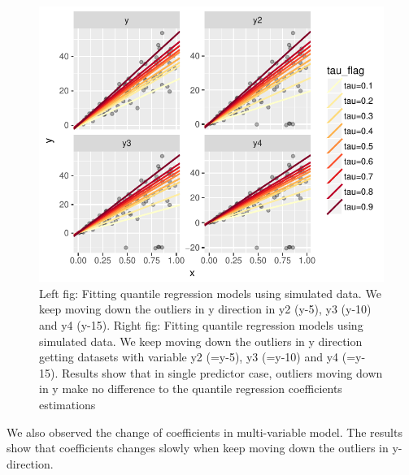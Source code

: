 \documentclass[11pt,a4paper,]{article}
\theoremstyle{definition}
\theoremstyle{definition}
\theoremstyle{remark}
\begin{document}
\begin{figure}

{\centering \includegraphics{Diagnosing_outliers_and_visualization_of_quantile_regression_models_files/figure-latex/move-y1-1} 

}

\caption{Left fig: Fitting quantile regression models using simulated data. We keep moving down the outliers in y direction in y2 (y-5), y3 (y-10) and y4 (y-15). Right fig: Fitting quantile regression models using simulated data. We keep moving down the outliers in y direction getting datasets with variable y2 (=y-5), y3 (=y-10) and y4 (=y-15). Results show that in single predictor case, outliers moving down in y make no difference to the quantile regression coefficients estimations}\label{fig:move-y1}
\end{figure}

We also observed the change of coefficients in multi-variable model. The
results show that coefficients changes slowly when keep moving down the
outliers in y-direction.
\end{document}
